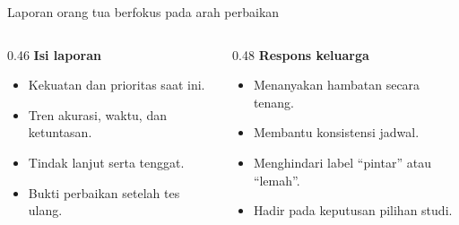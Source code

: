 \begin{frame}{Laporan orang tua berfokus pada arah perbaikan}
  \begin{columns}[T,onlytextwidth]
    \begin{column}{0.46\textwidth}
      {\color{StudentBlue}\bfseries Isi laporan}\par
      \begin{itemize}
        \item Kekuatan dan prioritas saat ini.
        \item Tren akurasi, waktu, dan ketuntasan.
        \item Tindak lanjut serta tenggat.
        \item Bukti perbaikan setelah tes ulang.
      \end{itemize}
    \end{column}
    \begin{column}{0.48\textwidth}
      {\color{StudentBlue}\bfseries Respons keluarga}\par
      \begin{itemize}
        \item Menanyakan hambatan secara tenang.
        \item Membantu konsistensi jadwal.
        \item Menghindari label ``pintar'' atau ``lemah''.
        \item Hadir pada keputusan pilihan studi.
      \end{itemize}
    \end{column}
  \end{columns}
  \vspace{0.15cm}
\end{frame}

